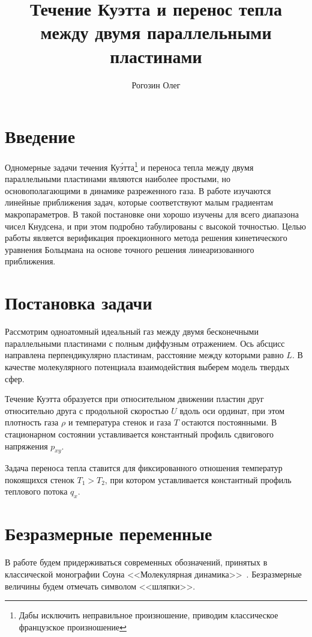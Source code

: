 \documentclass[english,russian,a4paper,12pt]{article}
\title{Течение Куэтта и перенос тепла между двумя параллельными пластинами}
\author{Рогозин Олег}
\begin{document}
\maketitle
\tableofcontents

\section{Введение}

Одномерные задачи течения Ку\'{э}тта\footnote
{
    Дабы исключить неправильное произношение, приводим классическое французское произношение
}
и переноса тепла между двумя параллельными пластинами являются наиболее простыми,
но основополагающими в динамике разреженного газа. В работе изучаются линейные приближения задач,
которые соответствуют малым градиентам макропараметров. В такой постановке они хорошо изучены
для всего диапазона чисел Кнудсена, и при этом подробно табулированы с высокой точностью.
Целью работы является верификация проекционного метода решения кинетического уравнения Больцмана
на основе точного решения линеаризованного приближения.

\section{Постановка задачи}

Рассмотрим одноатомный идеальный газ между двумя бесконечными параллельными пластинами с полным диффузным отражением.
Ось абсцисс направлена перпендикулярно пластинам, расстояние между которыми равно \(L\).
В качестве молекулярного потенциала взаимодействия выберем модель твердых сфер.

Течение Куэтта образуется при  относительном движении пластин друг относительно друга с продольной скоростью \(U\)
вдоль оси ординат, при этом плотность газа \(\rho\) и температура стенок и газа \(T\) остаются постоянными.
В стационарном состоянии уставливается константный профиль сдвигового напряжения \(p_{xy}\).

Задача переноса тепла ставится для фиксированного отношения температур покоящихся стенок \(T_1>T_2\),
при котором уставливается константный профиль теплового потока \(q_x\).

\section{Безразмерные переменные}

В работе будем придерживаться современных обозначений, принятых
в классической монографии Соуна <<Молекулярная динамика>>~\cite{sone2007}.
Безразмерные величины будем отмечать символом <<шляпки>>.
\end{document}
